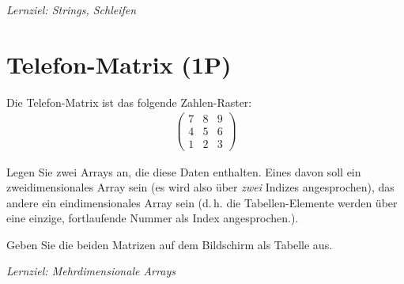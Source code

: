 \documentclass[
	ngerman,
	fontsize=10pt,
	parskip=half,
	titlepage=true,
	DIV=12
]{scrartcl}
\begin{document}
\emph{Lernziel: Strings, Schleifen}

\section{Telefon-Matrix (1P)}
Die Telefon-Matrix ist das folgende Zahlen-Raster:
\begin{align*}
\begin{pmatrix}
	7 & 8 & 9 \\
	4 & 5 & 6 \\
	1 & 2 & 3
\end{pmatrix}
\end{align*}

Legen Sie zwei Arrays an, die diese Daten enthalten. Eines davon soll ein zweidimensionales Array sein (es wird also über \emph{zwei} Indizes angesprochen), das andere ein eindimensionales Array sein (d.\,h. die Tabellen-Elemente werden über eine einzige, fortlaufende Nummer als Index angesprochen.).

Geben Sie die beiden Matrizen auf dem Bildschirm als Tabelle aus.

\emph{Lernziel: Mehrdimensionale Arrays}
\end{document}
